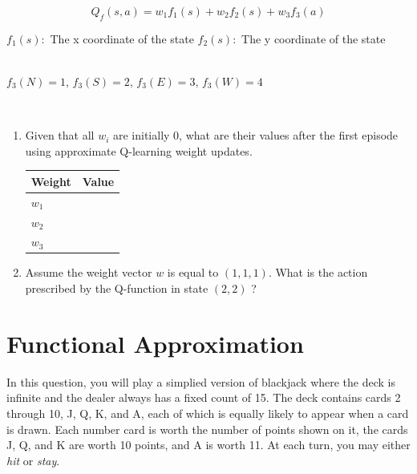 \documentclass[12pt]{article}
\begin{document}
\begin{enumerate}
  \begin{equation*}
  Q_f(s,a)=w_1f_1(s)+w_2f_2(s)+w_3f_3(a)
  \end{equation*}

  \hfill $f_1(s):$ The x coordinate of the state \hfill $f_2(s):$ The y coordinate of the state \hfill \hfill\\\\
\centerline {$f_3(N)=1$, $f_3(S)=2$, $f_3(E)=3$, $f_3(W)=4$}
\\

  \begin{enumerate}

  \item Given that all $w_i$ are initially 0, what are their values
    after the first episode using approximate Q-learning weight
    updates.
  
  \begin{center}\begin{tabular}{|l|l|} \hline
  \bf Weight  & \bf Value \\ \hline
  $w_1$ & \\
  $w_2$ & \\
  $w_3$ & \\ \hline
  \end{tabular}\end{center}

  \item Assume the weight vector $w$ is equal to $(1, 1, 1)$.  What is
  the action prescribed by the Q-function in state $(2,2)$ ?

  \end{enumerate}

\end{enumerate}

\clearpage

\section{Functional Approximation}

In this question, you will play a simplied version of blackjack where
the deck is infinite and the dealer always has a fixed count of 15.
The deck contains cards 2 through 10, J, Q, K, and A, each of which is
equally likely to appear when a card is drawn.  Each number card is
worth the number of points shown on it, the cards J, Q, and K are
worth 10 points, and A is worth 11.  At each turn, you may either {\it
  hit} or {\it stay}.
\end{document}
